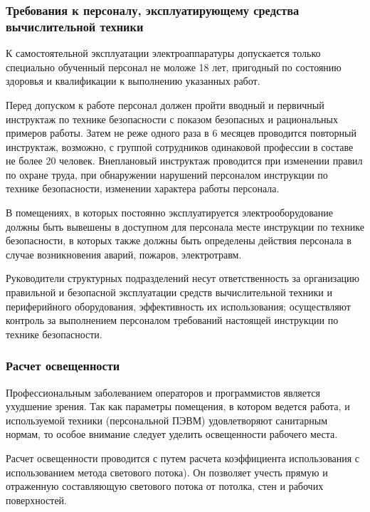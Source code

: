 \subsubsection{Требования к персоналу, эксплуатирующему средства вычислительной техники}
К самостоятельной эксплуатации электроаппаратуры допускается только специально обученный персонал не моложе 18 лет, пригодный по состоянию здоровья и квалификации к выполнению указанных работ.

Перед допуском к работе персонал должен пройти вводный и первичный инструктаж по технике безопасности с показом безопасных и рациональных примеров работы. Затем не реже одного раза в 6 месяцев проводится повторный инструктаж, возможно, с группой сотрудников одинаковой профессии в составе не более 20 человек. Внеплановый инструктаж проводится при изменении правил по охране труда, при обнаружении нарушений персоналом инструкции по технике безопасности, изменении характера работы персонала.

В помещениях, в которых постоянно эксплуатируется электрооборудование должны быть вывешены в доступном для персонала месте инструкции по технике безопасности, в которых также должны быть определены действия персонала в случае возникновения аварий, пожаров, электротравм.

Руководители структурных подразделений несут ответственность за организацию правильной и безопасной эксплуатации средств вычислительной техники и периферийного оборудования, эффективность их использования; осуществляют контроль за выполнением персоналом требований настоящей инструкции по технике безопасности.

\subsubsection{Расчет освещенности}
Профессиональным заболеванием операторов и программистов является ухудшение зрения.
Так как параметры помещения, в котором ведется работа, и используемой техники (персональной ПЭВМ) удовлетворяют санитарным нормам, то особое внимание следует уделить освещенности рабочего места.

Расчет освещенности проводится с путем расчета коэффициента использования с использованием метода светового потока).
Он позволяет учесть прямую и отраженную составляющую светового потока от потолка, стен и рабочих поверхностей.

